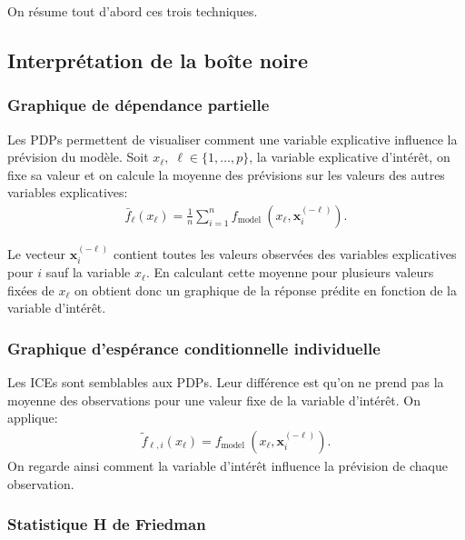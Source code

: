 On résume tout d'abord ces trois techniques.

\subsection{Interprétation de la boîte noire}
\label{subsec:BlackBox}

\subsubsection*{Graphique de dépendance partielle}

Les PDPs permettent de visualiser comment une variable explicative influence la prévision du modèle. Soit $x_{\ell},\;\ell \in \{1,\dots, p \}$, la variable explicative d'intérêt, on fixe sa valeur et on calcule la moyenne des prévisions sur les valeurs des autres variables explicatives:
\begin{align*}
\bar{f}_{\ell}\left(x_{\ell}\right)=\frac{1}{n} \sum_{i=1}^{n} f_{\text {model }}\left(x_{\ell}, \boldsymbol{x}_{i}^{(-\ell)}\right).
\end{align*}

Le vecteur $\boldsymbol{x}_{i}^{(-\ell)}$ contient toutes les valeurs observées des variables explicatives pour $i$ sauf la variable $x_{\ell}$. En calculant cette moyenne pour plusieurs valeurs fixées de $x_{\ell}$ on obtient donc un graphique de la réponse prédite en fonction de la variable d'intérêt. 


\subsubsection*{Graphique d'espérance conditionnelle individuelle}

Les ICEs sont semblables aux PDPs. Leur différence est qu'on ne prend pas la moyenne des observations pour une valeur fixe de la variable d'intérêt. On applique:
\begin{align*}\tilde{f}_{\ell, i}\left(x_{\ell}\right)=f_{\text {model }}\left(x_{\ell}, \boldsymbol{x}_{i}^{(-\ell)}\right).
\end{align*}
On regarde ainsi comment la variable d'intérêt influence la prévision de chaque observation. 

\subsubsection*{Statistique H de Friedman}


